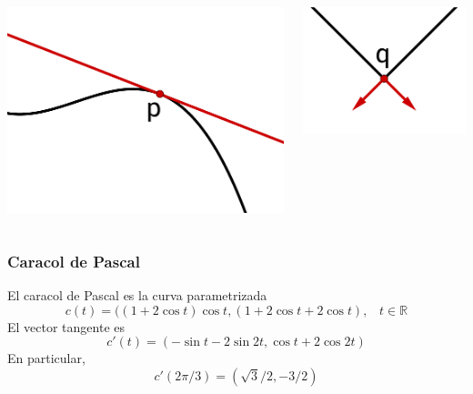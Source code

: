 \documentclass{beamer}
\def\realR{\mathbb{R}} %
\begin{document}
\begin{frame}
\begin{columns}
    \begin{center}
        \includegraphics[scale=0.25]{curva-suave}
    \end{center}
    \begin{center}
        \includegraphics[scale=0.35]{curva-no-suave}
    \end{center}
\end{columns}
\end{frame}


\begin{frame}
    \frametitle{Caracol de Pascal}
    El caracol de Pascal es la curva parametrizada
    $$ c(t)=((1+2\cos{t})\cos{t},(1+2\cos{t}+2\cos{t})\text{,} \quad t \in \realR$$
    El vector tangente es
    $$ c'(t)=(-\sin{t}-2\sin{2t},\cos{t}+2\cos{2t})$$
    En particular,
    $$ c'(2\pi/3) = (\sqrt{3}/2,-3/2)$$
\end{frame}
\end{document}
